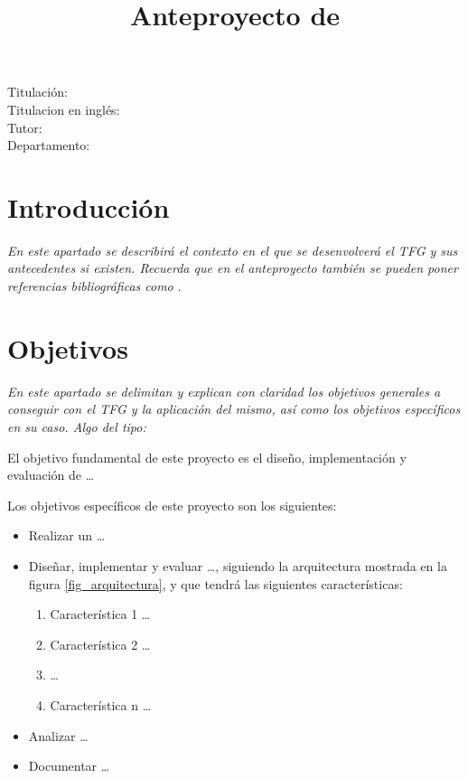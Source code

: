 \documentclass{article}
\title{Anteproyecto de \tfg}
\date{\myTfgDate}
\author{\myAuthorFullName}
\begin{document}
\maketitle

\begin{description}
    \item [Titulación:] \myUniversityTitle
    \item [Titulacion en inglés:] \myUniversityTitleEnglish
    \item [Tutor:] \myTeacherFullName
    \item [Departamento:] \myDepartment
\end{description}


\section{Introducción}
\label{sec:introduccion}

\textit{En este apartado se describirá el contexto en el que se desenvolverá el
  TFG y sus antecedentes si existen. Recuerda que en el anteproyecto
  también se pueden poner referencias bibliográficas como \cite{moore2002}}.

  \section{Objetivos}
\label{sec:objetivos-y-campo}

\textit{En este apartado se delimitan y explican con claridad los objetivos
  generales a conseguir con el TFG y la aplicación del mismo, así como los
  objetivos específicos en su caso. Algo del tipo:}

El objetivo fundamental de este proyecto es el diseño, implementación y
evaluación de \ldots

Los objetivos específicos de este proyecto son los siguientes:

\begin{itemize}
\item Realizar un  \ldots
\item Diseñar, implementar y evaluar  \ldots, siguiendo la arquitectura
  mostrada en la figura \ref{fig_arquitectura}, y que tendrá las
  siguientes características:

  \begin{enumerate}
  \item Característica 1 \ldots
  \item Característica 2 \ldots
  \item  \ldots
  \item Característica n \ldots
  \end{enumerate}

\item Analizar  \ldots

\item Documentar  \ldots

\end{itemize}
\end{document}
